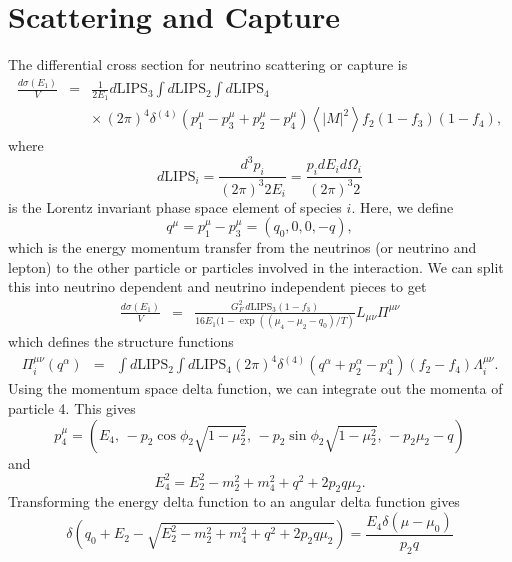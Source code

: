 \documentclass[12pt,letter]{article}
\begin{document}
\section{Scattering and Capture} 
The differential cross section for neutrino scattering or capture is 
\begin{eqnarray*}
\frac{d \sigma(E_1)}{V} &=& \frac{1}{2 E_1} d\textrm{LIPS}_3 \int d\textrm{LIPS}_2 
\int d\textrm{LIPS}_4 \\
&& \times \, (2 \pi)^4 \delta^{(4)}\left(p^\mu_1 - p^\mu_3 + p^\mu_2 - p^\mu_4 \right)
\left\langle \left| M \right|^2 \right \rangle f_2 (1-f_3) (1-f_4),
\end{eqnarray*}
where 
\begin{equation*}
d\textrm{LIPS}_i = \frac{d^3p_i}{(2\pi)^3 2 E_i} 
= \frac{p_i dE_i d \Omega_i}{(2\pi)^3 2} 
\end{equation*}
is the Lorentz invariant phase space element of species $i$.  Here, we define 
\begin{equation}
q^\mu = p_1^\mu - p_3^\mu=(q_0,0,0,-q),
\end{equation}
which is the energy momentum transfer from the neutrinos (or neutrino and lepton) to the other particle or particles involved in the interaction.  We can split this into neutrino dependent and neutrino independent pieces to get 
\begin{eqnarray*}
\frac{d \sigma(E_1)}{V} 
&=& \frac{G_F^2 \, d\textrm{LIPS}_3 (1-f_3)}
{16 E_1(1 - \exp((\mu_4 - \mu_2 - q_0)/T)} 
 L_{\mu \nu} \Pi^{\mu \nu}
\end{eqnarray*}
which defines the structure functions 
\begin{eqnarray*}
\Pi_{i}^{\mu \nu}(q^\alpha) &=& \int d\textrm{LIPS}_2 \int d\textrm{LIPS}_4
(2 \pi)^4 \delta^{(4)}\left(q^\alpha + p^\alpha_2 - p^\alpha_4 \right) 
(f_2-f_4) \Lambda_i^{\mu \nu}.
\end{eqnarray*} 
Using the momentum space delta function, we can integrate out the momenta of particle 4.  This gives
\begin{equation*}
p^\mu_4 = (E_4, \, 
-p_2 \cos \phi_2 \sqrt{1-\mu_2^2}, \,
-p_2 \sin \phi_2 \sqrt{1-\mu_2^2}, \,
-p_2 \mu_2 - q)
\end{equation*}
and 
\begin{equation*}
E_4^2 = E_2^2 - m_2^2 + m_4^2 + q^2 + 2 p_2 q \mu_2.  
\end{equation*}
Transforming the energy delta function to an angular delta function gives 
\begin{equation*}
\delta\left(q_0 + E_2 - \sqrt{E_2^2 - m_2^2 + m_4^2 + q^2 + 2 p_2 q \mu_2} \right) 
= \frac{E_4 \delta(\mu - \mu_0)}{p_2 q} 
\end{equation*} 
\end{document}
